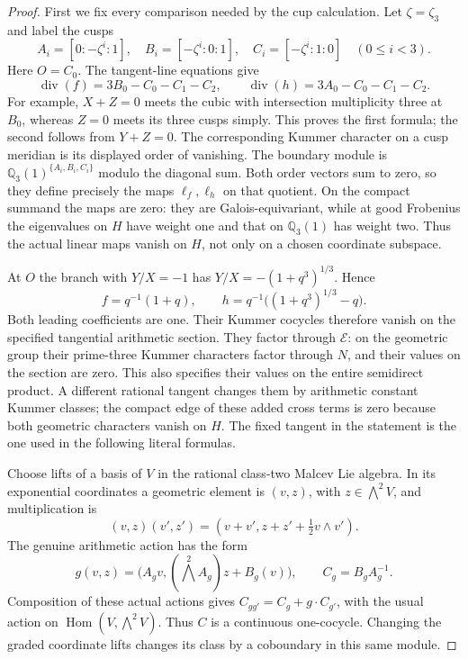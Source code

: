 \documentclass[11pt,oneside]{article}
\begin{document}
\begin{proof}
First we fix every comparison needed by the cup
calculation. Let $\zeta=\zeta_3$ and label the cusps
\[
 A_i=[0:-\zeta^i:1],\quad
 B_i=[-\zeta^i:0:1],\quad
 C_i=[-\zeta^i:1:0]\quad(0\le i<3).
\]
Here $O=C_0$. The tangent-line equations give
\[
 \operatorname{div}(f)=3B_0-C_0-C_1-C_2,
 \qquad
 \operatorname{div}(h)=3A_0-C_0-C_1-C_2.
 \tag{E.35.6}
\]
For example, $X+Z=0$ meets the cubic with
intersection multiplicity three at $B_0$, whereas
$Z=0$ meets its three cusps simply. This proves
the first formula; the second follows from
$Y+Z=0$. The corresponding Kummer character on
a cusp meridian is its displayed order of
vanishing. The boundary module is
$\mathbb Q_3(1)^{\{A_i,B_i,C_i\}}$ modulo the
diagonal sum. Both order vectors sum to zero,
so they define precisely the maps $\ell_f,\ell_h$
on that quotient. On the compact summand the
maps are zero: they are Galois-equivariant, while
at good Frobenius the eigenvalues on $H$ have
weight one and that on $\mathbb Q_3(1)$ has
weight two. Thus the actual linear maps vanish
on $H$, not only on a chosen coordinate subspace.

At $O$ the branch with $Y/X=-1$ has
$Y/X=-(1+q^3)^{1/3}$. Hence
\[
 f=q^{-1}(1+q),\qquad
 h=q^{-1}\bigl((1+q^3)^{1/3}-q\bigr).
 \tag{E.35.7}
\]
Both leading coefficients are one. Their
Kummer cocycles therefore vanish on the specified
tangential arithmetic section. They factor through
$\mathcal E$: on the geometric group their
prime-three Kummer characters factor through $N$,
and their values on the section are zero. This
also specifies their values on the entire
semidirect product. A different rational tangent
changes them by arithmetic constant Kummer
classes; the compact edge of these added cross
terms is zero because both geometric characters
vanish on $H$. The fixed tangent in the statement
is the one used in the following literal formulas.

Choose lifts of a basis of $V$ in the rational
class-two Malcev Lie algebra. In its exponential
coordinates a geometric element is $(v,z)$,
with $z\in\bigwedge^2V$, and multiplication is
\[
 (v,z)(v',z')=
       (v+v',z+z'+\tfrac12v\wedge v').
 \tag{E.35.8}
\]
The genuine arithmetic action has the form
\[
 g(v,z)=\bigl(A_gv,
          (\bigwedge^2A_g)z+B_g(v)\bigr),
 \qquad C_g=B_gA_g^{-1}.
 \tag{E.35.9}
\]
Composition of these actual actions gives
$C_{gg'}=C_g+g\cdot C_{g'}$, with the usual
action on $\operatorname{Hom}(V,\bigwedge^2V)$.
Thus $C$ is a continuous one-cocycle. Changing
the graded coordinate lifts changes its class by
a coboundary in this same module.


\end{proof}
\end{document}
